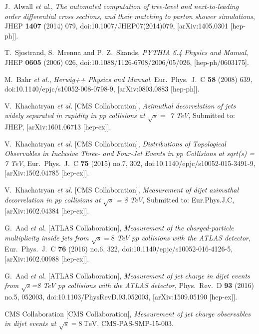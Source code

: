 \documentclass{PoS}
\begin{document}
\begin{thebibliography}{99}
  J.~Alwall {\it et al.},
  {\it The automated computation of tree-level and next-to-leading order differential cross sections, and their matching to parton shower simulations},
  JHEP {\bf 1407} (2014) 079,
  doi:10.1007/JHEP07(2014)079,
  [arXiv:1405.0301 [hep-ph]].

  T.~Sjostrand, S.~Mrenna and P.~Z.~Skands,
  {\it PYTHIA 6.4 Physics and Manual},
  JHEP {\bf 0605} (2006) 026,
  doi:10.1088/1126-6708/2006/05/026,
  [hep-ph/0603175].

  M.~Bahr {\it et al.},
  {\it Herwig++ Physics and Manual},
  Eur.\ Phys.\ J.\ C {\bf 58} (2008) 639,
  doi:10.1140/epjc/s10052-008-0798-9,
  [arXiv:0803.0883 [hep-ph]].

  V.~Khachatryan {\it et al.} [CMS Collaboration],
  {\it Azimuthal decorrelation of jets widely separated in rapidity in pp collisions at $\sqrt{s} =$ 7 TeV},
  Submitted to: JHEP,
  [arXiv:1601.06713 [hep-ex]].

  V.~Khachatryan {\it et al.} [CMS Collaboration],
  {\it Distributions of Topological Observables in Inclusive Three- and Four-Jet Events in pp Collisions at sqrt(s) = 7 TeV},
  Eur.\ Phys.\ J.\ C {\bf 75} (2015) no.7,  302,
  doi:10.1140/epjc/s10052-015-3491-9,
  [arXiv:1502.04785 [hep-ex]].

  V.~Khachatryan {\it et al.} [CMS Collaboration],
  {\it Measurement of dijet azimuthal decorrelation in pp collisions at $\sqrt{s}$ = 8 TeV},
  Submitted to: Eur.Phys.J.C,
  [arXiv:1602.04384 [hep-ex]].

  G.~Aad {\it et al.} [ATLAS Collaboration],
  {\it Measurement of the charged-particle multiplicity inside jets from $\sqrt{s}=8$ TeV $pp$ collisions with the ATLAS detector},
  Eur.\ Phys.\ J.\ C {\bf 76} (2016) no.6,  322,
  doi:10.1140/epjc/s10052-016-4126-5,
  [arXiv:1602.00988 [hep-ex]].

  G.~Aad {\it et al.} [ATLAS Collaboration],
  {\it Measurement of jet charge in dijet events from $\sqrt{s}$=8 TeV pp collisions with the ATLAS detector},
  Phys.\ Rev.\ D {\bf 93} (2016) no.5,  052003,
  doi:10.1103/PhysRevD.93.052003,
  [arXiv:1509.05190 [hep-ex]].

  CMS Collaboration [CMS Collaboration],
  {\it Measurement of jet charge observables in dijet events at $\sqrt{s}=8~\mathrm{TeV}$},
  CMS-PAS-SMP-15-003.


\end{thebibliography}
\end{document}
